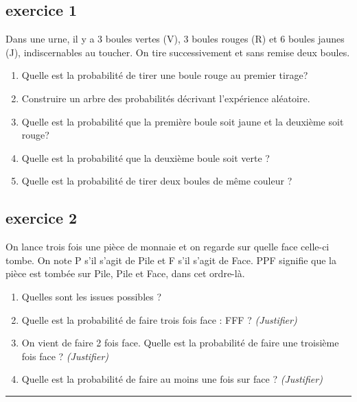 \documentclass[11pt]{article}
\newcommand{\horrule}[1]{\rule{\linewidth}{#1}} %
\begin{document}
\begin{multicols}{2}
  \subsection*{exercice 1}
  Dans une urne, il y a 3 boules vertes (V), 3 boules rouges (R) et 6 boules jaunes (J), indiscernables au toucher. On tire successivement et sans remise
  deux boules.
  \begin{enumerate}
  \item Quelle est la probabilité de tirer une boule rouge au premier tirage?
  \item Construire un arbre des probabilités décrivant l'expérience aléatoire.
  \item Quelle est la probabilité que la première boule soit jaune et la deuxième soit rouge?
  \item Quelle est la probabilité que la deuxième boule soit verte ?
  \item Quelle est la probabilité de tirer deux boules de même couleur ?
  \end{enumerate}

  \subsection*{exercice 2}

  On lance trois fois une pièce de monnaie et on regarde sur quelle face celle-ci tombe. On note P s’il s’agit de Pile et F s’il s’agit de Face. 
  PPF signifie que la pièce est tombée sur Pile, Pile et Face, dans cet ordre-là.

  \begin{enumerate}
  \item Quelles sont les issues possibles ?
  \item Quelle est la probabilité de faire trois fois face : FFF ?  \textit{(Justifier)}
  \item On vient de faire 2 fois face. Quelle est la probabilité de faire une troisième fois face ? \textit{(Justifier)}
  \item Quelle est la probabilité de faire au moins une fois sur face ? \textit{(Justifier)}
  \end{enumerate}
\end{multicols}

\vspace{-0.4cm}
\horrule{1px}
\vspace{-0.8cm}
\end{document}
